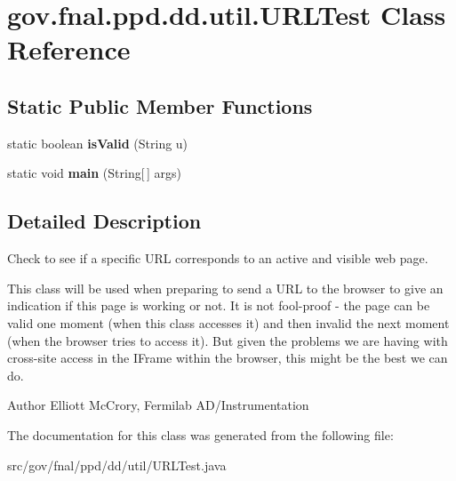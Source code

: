 \hypertarget{classgov_1_1fnal_1_1ppd_1_1dd_1_1util_1_1URLTest}{\section{gov.\-fnal.\-ppd.\-dd.\-util.\-U\-R\-L\-Test Class Reference}
\label{classgov_1_1fnal_1_1ppd_1_1dd_1_1util_1_1URLTest}
}
\subsection*{Static Public Member Functions}
\begin{DoxyCompactItemize}
\item 
\hypertarget{classgov_1_1fnal_1_1ppd_1_1dd_1_1util_1_1URLTest_a5980c2ae59d93447ff445eed97d29e63}{static boolean {\bfseries is\-Valid} (String u)}\label{classgov_1_1fnal_1_1ppd_1_1dd_1_1util_1_1URLTest_a5980c2ae59d93447ff445eed97d29e63}

\item 
\hypertarget{classgov_1_1fnal_1_1ppd_1_1dd_1_1util_1_1URLTest_ab2b645bc0cff14b4fb57aa99b00ad9ac}{static void {\bfseries main} (String\mbox{[}$\,$\mbox{]} args)}\label{classgov_1_1fnal_1_1ppd_1_1dd_1_1util_1_1URLTest_ab2b645bc0cff14b4fb57aa99b00ad9ac}

\end{DoxyCompactItemize}


\subsection{Detailed Description}
Check to see if a specific U\-R\-L corresponds to an active and visible web page.

This class will be used when preparing to send a U\-R\-L to the browser to give an indication if this page is working or not. It is not fool-\/proof -\/ the page can be valid one moment (when this class accesses it) and then invalid the next moment (when the browser tries to access it). But given the problems we are having with cross-\/site access in the I\-Frame within the browser, this might be the best we can do.

\begin{DoxyAuthor}{Author}
Elliott Mc\-Crory, Fermilab A\-D/\-Instrumentation 
\end{DoxyAuthor}


The documentation for this class was generated from the following file\-:\begin{DoxyCompactItemize}
\item 
src/gov/fnal/ppd/dd/util/U\-R\-L\-Test.\-java\end{DoxyCompactItemize}
